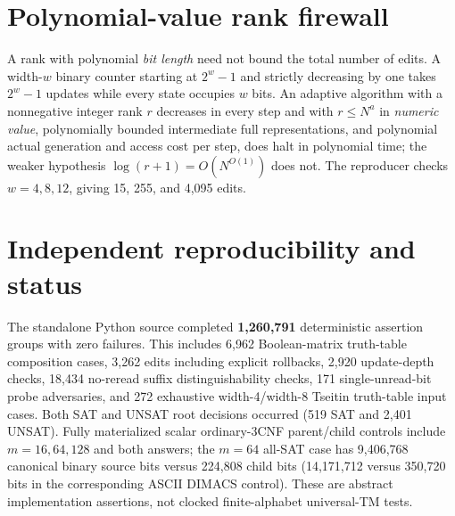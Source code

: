 \documentclass[11pt]{article}
\begin{document}
\section{Polynomial-value rank firewall}
A rank with polynomial \emph{bit length} need not bound the total number of edits. A width-$w$ binary counter starting at $2^w-1$ and strictly decreasing by one takes $2^w-1$ updates while every state occupies $w$ bits. An adaptive algorithm with a nonnegative integer rank $r$ decreases in every step and with $r\le N^a$ in \emph{numeric value}, polynomially bounded intermediate full representations, and polynomial actual generation and access cost per step, does halt in polynomial time; the weaker hypothesis $\log(r+1)=O(N^{O(1)})$ does not. The reproducer checks $w=4,8,12$, giving 15, 255, and 4,095 edits.

\section{Independent reproducibility and status}
The standalone Python source completed \textbf{1,260,791} deterministic assertion groups with zero failures. This includes 6,962 Boolean-matrix truth-table composition cases, 3,262 edits including explicit rollbacks, 2,920 update-depth checks, 18,434 no-reread suffix distinguishability checks, 171 single-unread-bit probe adversaries, and 272 exhaustive width-4/width-8 Tseitin truth-table input cases. Both SAT and UNSAT root decisions occurred (519 SAT and 2,401 UNSAT). Fully materialized scalar ordinary-3CNF parent/child controls include $m=16,64,128$ and both answers; the $m=64$ all-SAT case has 9,406,768 canonical binary source bits versus 224,808 child bits (14,171,712 versus 350,720 bits in the corresponding ASCII DIMACS control). These are abstract implementation assertions, not clocked finite-alphabet universal-TM tests.
\end{document}
